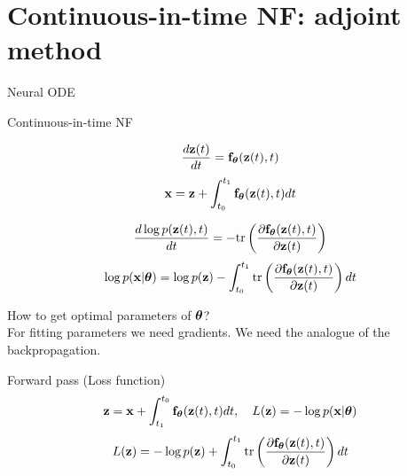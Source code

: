\section{Continuous-in-time NF: adjoint method}
\begin{frame}{Neural ODE}
	\begin{block}{Continuous-in-time NF}
		{\small
		\begin{minipage}[t]{0.4\columnwidth}
			\[
	 			 \frac{d \mathbf{z}(t)}{dt} = \mathbf{f}_{\boldsymbol{\theta}}(\mathbf{z}(t), t) 	 
	 		\]
	 		\[
	 			 \mathbf{x} = \mathbf{z} + \int_{t_0}^{t_1} \mathbf{f}_{\boldsymbol{\theta}}(\mathbf{z}(t), t) dt 
			\]
		\end{minipage}%
		\begin{minipage}[t]{0.6\columnwidth}
			\vspace{-0.4cm}
			\[
					\frac{d \log p(\mathbf{z}(t), t)}{d t} = - \text{tr} \left( \frac{\partial \mathbf{f}_{\boldsymbol{\theta}}(\mathbf{z}(t), t)}{\partial \mathbf{z}(t)} \right) 
	 		\]
	 		\[
					\log p(\mathbf{x} | \boldsymbol{\theta}) = \log p(\mathbf{z}) - \int_{t_0}^{t_1} \text{tr} \left( \frac{\partial \mathbf{f}_{\boldsymbol{\theta}}(\mathbf{z}(t), t)}{\partial \mathbf{z}(t)} \right) dt
			\]
		\end{minipage}
		}
	\end{block}
	How to get optimal parameters of $\boldsymbol{\theta}$? \\
	
	For fitting parameters we need gradients. We need the analogue of the backpropagation.
	\begin{block}{Forward pass (Loss function)}
		\vspace{-0.3cm}
		\[
			\mathbf{z} = \mathbf{x} + \int_{t_1}^{t_0} \mathbf{f}_{\boldsymbol{\theta}}(\mathbf{z}(t), t) dt, \quad L(\mathbf{z}) = - \log p(\mathbf{x} | \boldsymbol{\theta})
		\]
		\[
			L(\mathbf{z}) = - \log p(\mathbf{z}) + \int_{t_0}^{t_1} \text{tr} \left( \frac{\partial \mathbf{f}_{\boldsymbol{\theta}}(\mathbf{z}(t), t)}{\partial \mathbf{z}(t)} \right) dt
		\]
	\end{block}
\end{frame}
